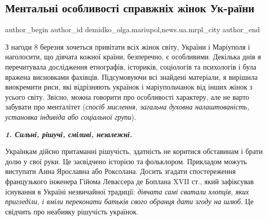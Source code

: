  
 
 
 
 
 
\subsection{Ментальні особливості справжніх жінок Ук\hyp{}раїни}
\label{sec:08_03_2021.stz.news.ua.mrpl_city.1.mentalni_osoblyvosti_spravzhnih_zhinok_ukrainy}
 
\ifcmt
 author_begin
   author_id demidko_olga.mariupol,news.ua.mrpl_city
 author_end
\fi


З нагоди 8 березня хочеться привітати всіх жінок світу, України і Маріуполя і
наголосити, що дівчата кожної країни, безперечно, є особливими. Декілька днів я
перечитувала дослідження етнографів, істориків, соціологів та психологів і була
вражена висновками фахівців. Підсумовуючи всі знайдені матеріали, я вирішила
виокремити риси, які відрізняють українок і маріупольчанок від інших жінок з
усього світу. Звісно, можна говорити про особливості характеру, але не варто
забувати про менталітет (\emph{спосіб мислення, загальна духовна налаштованість,
установка індивіда або соціальної групи}).

\textbf{\emph{1. Сильні, рішучі, сміливі, незалежні.}}

Українкам дійсно притаманні рішучість, здатність не коритися обставинам і брати
долю у свої руки. Це засвідчено історією та фольклором. Прикладом можуть
виступати Анна Ярославна або Роксолана. Досить згадати спостереження
французького інженера Гійома Левассера де Боплана XVII ст., який зафіксував
існування в Україні незвичайної традиції: \emph{дівчата самі сватали хлопців, яких
пригледіли, і вміли переконати батьків свого обранця дати згоду на шлюб}. Це
свідчить про неабияку рішучість українок.

